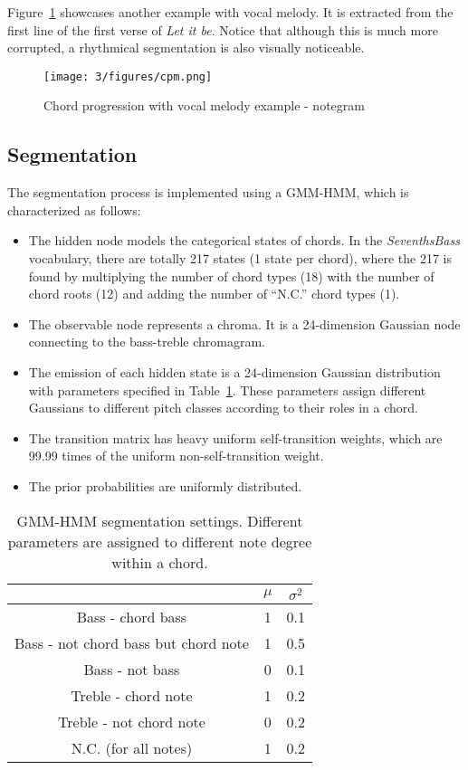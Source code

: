 Figure~\ref{fig:3-cpm} showcases another example with vocal melody. It is extracted from the first line of the first verse of {\it Let it be}. Notice that although this is much more corrupted, a rhythmical segmentation is also visually noticeable.
\begin{figure}
\centering
\texttt{[image: 3/figures/cpm.png]}
\caption{Chord progression with vocal melody example - notegram}
\label{fig:3-cpm}
\end{figure}

\newpage
\subsection{Segmentation} \label{sec:3-sg}
The segmentation process is implemented using a GMM-HMM, which is characterized as follows:
\begin{itemize}
	\item The hidden node models the categorical states of chords. In the \textit{SeventhsBass} vocabulary, there are totally 217 states (1 state per chord), where the 217 is found by multiplying the number of chord types (18) with the number of chord roots (12) and adding the number of ``N.C.'' chord types (1).
	
	\item The observable node represents a chroma. It is a 24-dimension Gaussian node connecting to the bass-treble chromagram.
	
	\item The emission of each hidden state is a 24-dimension Gaussian distribution with parameters specified in Table~\ref{tab:3-gaussian}. These parameters assign different Gaussians to different pitch classes according to their roles in a chord.
	
	\item The transition matrix has heavy uniform self-transition weights, which are 99.99 times of the uniform non-self-transition weight.
	
	\item The prior probabilities are uniformly distributed.
\end{itemize}

\begin{table}
\centering
\footnotesize
\begin{tabular}{|c|c|c|} \hline
      & $\mu$ & $\sigma^2$ \\ \hline
 Bass - chord bass & 1 & 0.1 \\ \hline
 Bass - not chord bass but chord note & 1 & 0.5  \\ \hline
 Bass - not bass & 0 & 0.1 \\ \hline
 Treble - chord note & 1 & 0.2  \\ \hline
 Treble - not chord note & 0 & 0.2 \\ \hline
 N.C. (for all notes)  & 1 & 0.2  \\ \hline
\end{tabular}
\caption{GMM-HMM segmentation settings. Different parameters are assigned to different note degree within a chord.}
\label{tab:3-gaussian}
\end{table}

